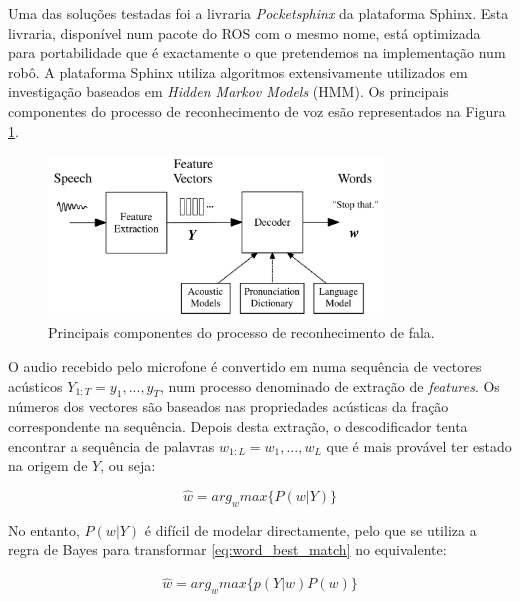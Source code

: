 \documentclass[journal]{IEEEtran}
\begin{document}
Uma das soluções testadas foi a livraria \textit{Pocketsphinx} da plataforma Sphinx. Esta livraria, disponível num pacote do ROS com o mesmo nome, está optimizada para portabilidade que é exactamente o que pretendemos na implementação num robô. A plataforma Sphinx utiliza algoritmos extensivamente utilizados em investigação baseados em \textit{Hidden Markov Models} (HMM). Os principais componentes do processo de reconhecimento de voz esão representados na Figura \ref{fig:voicerecprocess}.

\begin{figure}[ht]
  \centering
  \includegraphics[width=21pc]{voice_rec_process.png}
  \caption{Principais componentes do processo de reconhecimento de fala.}
  \label{fig:voicerecprocess}
\end{figure}

O audio recebido pelo microfone é convertido em numa sequência de vectores acústicos $Y_{1:T}=y_1,...,y_T$, num processo denominado de extração de \textit{features}. Os números dos vectores são baseados nas propriedades acústicas da fração correspondente na sequência. Depois desta extração, o descodificador tenta encontrar a sequência de palavras $w_{1:L}=w_1,...,w_L$ que é mais provável ter estado na origem de $Y$, ou seja:

\begin{equation}
  \hat{w}=arg_w max \{ P(w|Y) \}
\label{eq:word_best_match}
\end{equation}

No entanto, $P(w|Y)$ é difícil de modelar directamente, pelo que se utiliza a regra de Bayes para transformar \ref{eq:word_best_match} no equivalente:

\begin{eqnarray}
  \label{eq:word_bm_equi}
   \hat{w} = arg_w max \{ p(Y|w) P(w) \}
\end{eqnarray}
\end{document}
